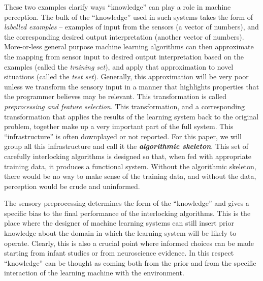 These two examples clarify ways ``knowledge'' can play a role in
machine perception.  The bulk of the ``knowledge'' used in
such systems takes the form
of {\em labelled examples} -- examples of input from the sensors (a
vector of numbers), and the corresponding desired output
interpretation (another vector of numbers).  
%
More-or-less general
purpose machine learning algorithms can then approximate the mapping
from sensor input to desired output interpretation based on the
examples (called the {\em training set}), and apply that approximation to novel
situations (called the {\em test set}).  
%
Generally, this approximation will be very poor unless we transform
the sensory input in a manner that highlights properties that the
programmer believes may be relevant.  This transformation is called
{\em preprocessing and feature selection}.
%
This transformation, and a corresponding transformation that 
applies the results of the learning system back to the original
problem, together make up a very important part of the full
system.  This ``infrastructure'' is often downplayed or not
reported.
%
%
%
For this paper, we will group all this infrastructure and call it 
the {\bf \em algorithmic skeleton}.
%
%
%
This set of carefully interlocking algorithms is designed so that,
when fed with appropriate training data, it produces a
functional system.  
%
Without the algorithmic skeleton, there would be
no way to make sense of the training data, and without the
data, perception would be crude and uninformed.
%

The sensory preprocessing determines the form of the ``knowledge'' and 
gives a specific bias to the final performance of the interlocking algorithms.
This is the place where the designer of machine learning systems can 
still insert prior knowledge about the domain in which the learning
system will be likely to operate. Clearly, this is also a crucial point 
where informed choices can be made starting from infant studies or from 
neuroscience evidence. In this respect ``knowledge'' can be thought as 
coming both from the prior and from the specific interaction of the learning 
machine with the environment. 


